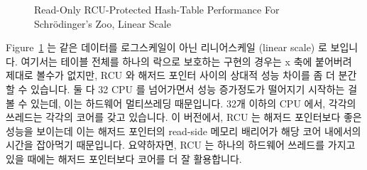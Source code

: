 \begin{figure}[tb]
\centering
{}
\caption{Read-Only RCU-Protected Hash-Table Performance For Schr\"odinger's Zoo, Linear Scale}
\label{fig:datastruct:Read-Only RCU-Protected Hash-Table Performance For Schroedinger's Zoo, Linear Scale}
\end{figure}

Figure~\ref{fig:datastruct:Read-Only RCU-Protected Hash-Table Performance For Schroedinger's Zoo, Linear Scale}
는 같은 데이터를 로그스케일이 아닌 리니어스케일 (linear scale) 로 보입니다.
여기서는 테이블 전체를 하나의 락으로 보호하는 구현의 경우는 x 축에 붙어버려
제대로 볼수가 없지만, RCU 와 해저드 포인터 사이의 상대적 성능 차이를 좀 더
분간할 수 있습니다.
둘 다 32 CPU 를 넘어가면서 성능 증가정도가 떨어지기 시작하는 걸 볼 수 있는데,
이는 하드웨어 멀티쓰레딩 때문입니다.
32개 이하의 CPU 에서, 각각의 쓰레드는 각각의 코어를 갖고 있습니다.
이 버전에서, RCU 는 해저드 포인터보다 좋은 성능을 보이는데 이는 해저드 포인터의
read-side 메모리 배리어가 해당 코어 내에서의 시간을 잡아먹기 때문입니다.
요약하자면, RCU 는 하나의 하드웨어 쓰레드를 가지고 있을 때에는 해저드
포인터보다 코어를 더 잘 활용합니다.

